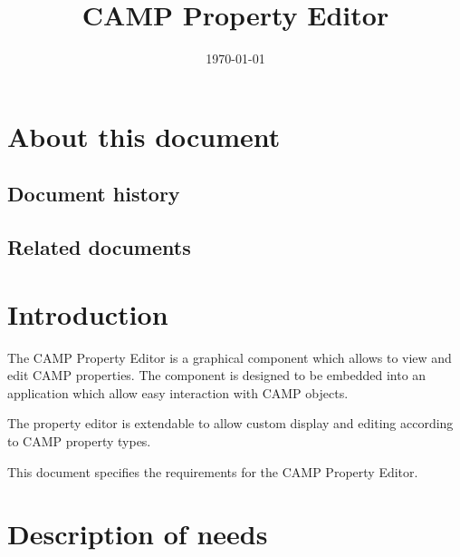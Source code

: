 \documentclass[a4paper, twoside]{report}
\title{CAMP Property Editor}
\date{\today}
\begin{document}
\maketitle

\chapter*{About this document}

\section*{Document history}

\begin{historytable}
\end{historytable}

\section*{Related documents}

\begin{documenttable}
\end{documenttable}

\tableofcontents


\chapter{Introduction\label{sec:introduction}}

The CAMP Property Editor is a graphical component which allows to view and edit CAMP properties. The
component is designed to be embedded into an application which allow easy interaction with CAMP
objects.

The property editor is extendable to allow custom display and editing according to CAMP property
types.

This document specifies the requirements for the CAMP Property Editor.

\chapter{Description of needs\label{sec:needs}}
\end{document}
